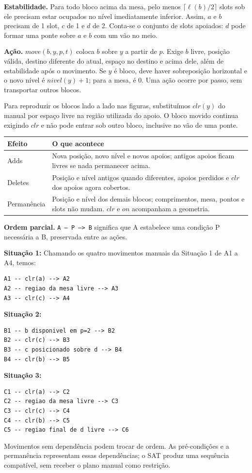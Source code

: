 \documentclass[11pt,a4paper]{article}
\newcommand{\code}[1]{\texttt{#1}}
\begin{document}
\textbf{Estabilidade.} Para todo bloco acima da mesa, pelo menos $\lceil\ell(b)/2\rceil$ slots sob ele precisam estar ocupados no nível imediatamente inferior. Assim, $a$ e $b$ precisam de 1 slot, $c$ de 1 e $d$ de 2. Conta-se o conjunto de slots apoiados: $d$ pode formar uma ponte sobre $a$ e $b$ com um vão no meio.

\textbf{Ação.} $move(b,y,p,t)$ coloca $b$ sobre $y$ a partir de $p$. Exige $b$ livre, posição válida, destino diferente do atual, espaço no destino e acima dele, além de estabilidade após o movimento. Se $y$ é bloco, deve haver sobreposição horizontal e o novo nível é $nivel(y)+1$; para a mesa, é 0. Uma ação ocorre por passo, sem transportar outros blocos.

Para reproduzir os blocos lado a lado nas figuras, substituímos $clr(y)$ do manual por espaço livre na região utilizada do apoio. O bloco movido continua exigindo $clr$ e não pode entrar sob outro bloco, inclusive no vão de uma ponte.

\newpage
\begin{tabularx}{\linewidth}{lY}
\toprule Efeito & O que acontece \\ \midrule
Adds & Nova posição, novo nível e novos apoios; antigos apoios ficam livres se nada permanecer acima.\\
Deletes & Posição e nível antigos quando diferentes, apoios perdidos e $clr$ dos apoios agora cobertos.\\
Permanência & Posição e nível dos demais blocos; comprimentos, mesa, pontos e slots não mudam. $clr$ e $on$ acompanham a geometria.\\ \bottomrule
\end{tabularx}

\textbf{Ordem parcial.} \code{A -- P --> B} significa que A estabelece uma condição P necessária a B, preservada entre as ações.

\textbf{Situação 1:}
 Chamando os quatro movimentos manuais da Situação 1 de A1 a A4, temos:
\begin{lstlisting}
A1 -- clr(a) --> A2
A2 -- regiao da mesa livre --> A3
A3 -- clr(c) --> A4
\end{lstlisting}

\textbf{Situação 2:}
\begin{lstlisting}
B1 -- b disponivel em p=2 --> B2
B2 -- clr(c) --> B3
B3 -- c posicionado sobre d --> B4
B4 -- clr(b) --> B5
\end{lstlisting}

\textbf{Situação 3:}
\begin{lstlisting}
C1 -- clr(a) --> C2
C2 -- regiao da mesa livre --> C3
C3 -- clr(c) --> C4
C4 -- clr(b) --> C5
C5 -- regiao final de d livre --> C6
\end{lstlisting}
Movimentos sem dependência podem trocar de ordem. As pré-condições e a permanência representam essas dependências; o SAT produz uma sequência compatível, sem receber o plano manual como restrição.
\end{document}
